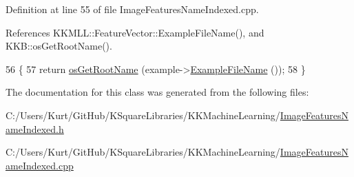 Definition at line 55 of file Image\+Features\+Name\+Indexed.\+cpp.



References K\+K\+M\+L\+L\+::\+Feature\+Vector\+::\+Example\+File\+Name(), and K\+K\+B\+::os\+Get\+Root\+Name().


\begin{DoxyCode}
56 \{
57   \textcolor{keywordflow}{return}  \hyperlink{namespace_k_k_b_af5b668ed9902d7f93b62529664a739f0}{osGetRootName} (example->\hyperlink{class_k_k_m_l_l_1_1_feature_vector_ab47c89ab1e9396664fdc0dc34b6e1ab5}{ExampleFileName} ());
58 \}
\end{DoxyCode}


The documentation for this class was generated from the following files\+:\begin{DoxyCompactItemize}
\item 
C\+:/\+Users/\+Kurt/\+Git\+Hub/\+K\+Square\+Libraries/\+K\+K\+Machine\+Learning/\hyperlink{_image_features_name_indexed_8h}{Image\+Features\+Name\+Indexed.\+h}\item 
C\+:/\+Users/\+Kurt/\+Git\+Hub/\+K\+Square\+Libraries/\+K\+K\+Machine\+Learning/\hyperlink{_image_features_name_indexed_8cpp}{Image\+Features\+Name\+Indexed.\+cpp}\end{DoxyCompactItemize}

